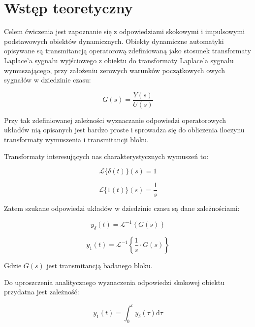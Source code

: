 \documentclass[12pt]{article}
\begin{document}
 
 

\section{Wstęp teoretyczny} 

Celem ćwiczenia jest zapoznanie się z odpowiedziami skokowymi i impulsowymi
podstawowych obiektów dynamicznych. Obiekty dynamiczne automatyki opisywane są
transmitancją operatorową zdefiniowaną jako stosunek transformaty Laplace'a
sygnału wyjściowego z obiektu do transformaty Laplace'a sygnału wymuszającego,
przy założeniu zerowych warunków początkowych owych sygnałów w dziedzinie czasu:

\begin{equation*}
	G(s)=\frac{Y(s)}{U(s)}
\end{equation*}

Przy tak zdefiniowanej zależności wyznaczanie odpowiedzi operatorowych układów
nią opisanych jest bardzo proste i sprowadza się do obliczenia iloczynu
transformaty wymuszenia i transmitancji bloku.

Transformaty interesujących nas charakterystycznych wymuszeń to:

\begin{equation*}
	\mathcal{L}\{\delta(t)\}(s)=1
\end{equation*}

\begin{equation*}
	\mathcal{L}\{1(t)\}(s)=\frac{1}{s}
\end{equation*}

Zatem szukane odpowiedzi układów w dziedzinie czasu są dane zależnościami:

\begin{equation}
	y_{\delta}(t)=\mathcal{L}^{-1}\left\{G(s)\right\}
	\label{equ:tranimp}
\end{equation}

\begin{equation}
	y_1(t)=\mathcal{L}^{-1}\left\{\frac{1}{s}\cdot G(s)\right\}
	\label{equ:transtep}
\end{equation}

Gdzie $G(s)$ jest transmitancją badanego bloku.

Do uproszczenia analitycznego wyznaczenia odpowiedzi skokowej obiektu przydatna
jest zależność:

\begin{equation}
	y_1(t)=\int_0^t y_{\delta}(\tau)\mbox{d}\tau
\end{equation}
\end{document}
